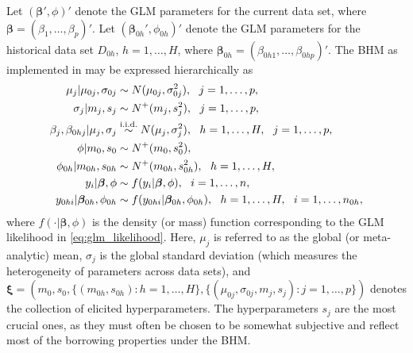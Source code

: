 Let $(\bm{\beta}', \phi)'$ denote the GLM parameters for the current data set, where $\bm{\beta} = (\beta_1, \ldots, \beta_p)'$. Let $(\bm{\beta}_{0h}', \phi_{0h})'$ denote the GLM parameters for the historical data set $D_{0h}$, $h = 1, \ldots, H$, where $\bm{\beta}_{0h} = (\beta_{0h1}, \ldots, \beta_{0hp})'$.
The BHM as implemented in  may be expressed hierarchically as
\begin{align}
    \mu_j | \mu_{0j}, \sigma_{0j} &\sim N(\mu_{0j}, \sigma_{0j}^2)
        , \ \ j = 1, \ldots, p
    ,\notag \\
    \sigma_j | m_j, s_j &\sim N^+(m_j, s_j^2)
        , \ \ j = 1, \ldots, p
    ,\notag \\
    \beta_j, \beta_{0hj} | \mu_j, \sigma_j &\overset{\text{i.i.d.}}{\sim} N(\mu_j, \sigma_j^2)
        , \ \ h = 1, \ldots, H
        , \ \ j = 1, \ldots, p
    ,\notag \\
    \phi | m_0, s_0 &\sim N^{+}(m_0, s_0^2)
        , \notag \\
    \phi_{0h} | m_{0h}, s_{0h} &\sim N^{+}(m_{0h}, s_{0h}^2)
        , \ \  h = 1, \ldots, H
    ,\notag \\
    y_i    | \bm{\beta}, \phi &\sim f(y_i | \bm{\beta}, \phi)
        , \ \ i = 1, \ldots, n
    , \notag \\
    y_{0hi} | \bm{\beta}_{0h}, \phi_{0h} &\sim f(y_{0hi} | \bm{\beta}_{0h}, \phi_{0h}), 
        \ \ h = 1, \ldots, H, 
        \ \ i = 1, \ldots, n_{0h}, 
    \label{eq:bhm}
\end{align}
where $f(\cdot | \bm{\beta}, \phi)$ is the density (or mass) function corresponding to the GLM likelihood in \eqref{eq:glm_likelihood}. Here, $\mu_j$ is referred to as the global (or meta-analytic) mean, $\sigma_j$ is the global standard deviation (which measures the heterogeneity of parameters across data sets), and $\bm{\xi} = ( m_0, s_0, \{(m_{0h}, s_{0h}): h = 1, \ldots, H \}, \{ (\mu_{0j}, \sigma_{0j}, m_j, s_j): j = 1, \ldots, p \} )$ denotes the collection of elicited hyperparameters.
The hyperparameters $s_j$ are the most crucial ones, as they must often be chosen to be somewhat subjective and reflect most of the borrowing properties under the BHM.

